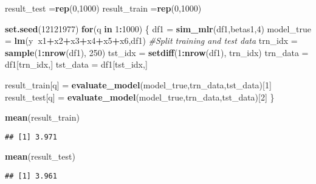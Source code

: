 \documentclass[
]{article}
\newenvironment{Shaded}{\begin{snugshade}}{\end{snugshade}}
\newcommand{\CommentTok}[1]{\textcolor[rgb]{0.56,0.35,0.01}{\textit{#1}}}
\newcommand{\ControlFlowTok}[1]{\textcolor[rgb]{0.13,0.29,0.53}{\textbf{#1}}}
\newcommand{\DecValTok}[1]{\textcolor[rgb]{0.00,0.00,0.81}{#1}}
\newcommand{\KeywordTok}[1]{\textcolor[rgb]{0.13,0.29,0.53}{\textbf{#1}}}
\newcommand{\NormalTok}[1]{#1}
\newcommand{\OperatorTok}[1]{\textcolor[rgb]{0.81,0.36,0.00}{\textbf{#1}}}
\newcommand{\StringTok}[1]{\textcolor[rgb]{0.31,0.60,0.02}{#1}}
\begin{document}
\begin{Shaded}
\begin{Highlighting}[]
\NormalTok{result_test =}\KeywordTok{rep}\NormalTok{(}\DecValTok{0}\NormalTok{,}\DecValTok{1000}\NormalTok{)  }
\NormalTok{result_train =}\KeywordTok{rep}\NormalTok{(}\DecValTok{0}\NormalTok{,}\DecValTok{1000}\NormalTok{)  }

\KeywordTok{set.seed}\NormalTok{(}\DecValTok{12121977}\NormalTok{)}
\ControlFlowTok{for}\NormalTok{(q }\ControlFlowTok{in} \DecValTok{1}\OperatorTok{:}\DecValTok{1000}\NormalTok{)}
\NormalTok{\{}
\NormalTok{  df1 =}\StringTok{ }\KeywordTok{sim_mlr}\NormalTok{(df1,betas1,}\DecValTok{4}\NormalTok{)}
\NormalTok{  model_true =}\StringTok{ }\KeywordTok{lm}\NormalTok{(y}\OperatorTok{~}\NormalTok{x1}\OperatorTok{+}\NormalTok{x2}\OperatorTok{+}\NormalTok{x3}\OperatorTok{+}\NormalTok{x4}\OperatorTok{+}\NormalTok{x5}\OperatorTok{+}\NormalTok{x6,df1)}
  \CommentTok{#Split training and test data}
\NormalTok{  trn_idx =}\StringTok{ }\KeywordTok{sample}\NormalTok{(}\DecValTok{1}\OperatorTok{:}\KeywordTok{nrow}\NormalTok{(df1), }\DecValTok{250}\NormalTok{)}
\NormalTok{  tst_idx =}\StringTok{ }\KeywordTok{setdiff}\NormalTok{(}\DecValTok{1}\OperatorTok{:}\KeywordTok{nrow}\NormalTok{(df1), trn_idx)}
\NormalTok{  trn_data =}\StringTok{ }\NormalTok{df1[trn_idx,]}
\NormalTok{  tst_data  =}\StringTok{ }\NormalTok{df1[tst_idx,]}

\NormalTok{  result_train[q] =}\StringTok{ }\KeywordTok{evaluate_model}\NormalTok{(model_true,trn_data,tst_data)[}\DecValTok{1}\NormalTok{]}
\NormalTok{  result_test[q] =}\StringTok{ }\KeywordTok{evaluate_model}\NormalTok{(model_true,trn_data,tst_data)[}\DecValTok{2}\NormalTok{]}
\NormalTok{\}}

\KeywordTok{mean}\NormalTok{(result_train)}
\end{Highlighting}
\end{Shaded}

\begin{verbatim}
## [1] 3.971
\end{verbatim}

\begin{Shaded}
\begin{Highlighting}[]
\KeywordTok{mean}\NormalTok{(result_test)}
\end{Highlighting}
\end{Shaded}

\begin{verbatim}
## [1] 3.961
\end{verbatim}
\end{document}
